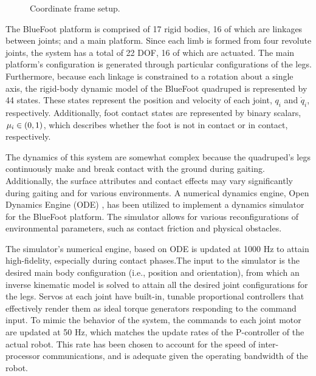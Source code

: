 %
		\begin{figure}[h!]
			\centering
			\caption{Coordinate frame setup.}
			\label{fig::narx_net}
		\end{figure}
%
		The BlueFoot platform is comprised of 17 rigid bodies, 16 of which are linkages between joints; and a main platform. Since each limb is formed from four revolute joints, the system has a total of 22 DOF, 16 of which are actuated. The main platform's configuration is generated through particular configurations of the legs. Furthermore, because each linkage is constrained to a rotation about a single axis, the rigid-body dynamic model of the BlueFoot quadruped is represented by 44 states. These states represent the position and velocity of each joint, $q_{i}$ and $\dot{q}_{i}$, respectively. Additionally, foot contact states are represented by binary scalars, $\mu_{i} \in \left(0,1\right)$, which describes whether the foot is not in contact or in contact, respectively.

		The dynamics of this system are somewhat complex because the quadruped's legs continuously make and break contact with the ground during gaiting. Additionally, the surface attributes and contact effects may vary significantly during gaiting and for various environments. A numerical dynamics engine, Open Dynamics Engine (ODE) \cite{ODE_Website}, has been utilized to implement a dynamics simulator for the BlueFoot platform. The simulator allows for various reconfigurations of environmental parameters, such as contact friction and physical obstacles. 

		The simulator's numerical engine, based on ODE is updated at 1000 Hz to attain high-fidelity, especially during contact phases.The input to the simulator is the desired main body configuration (i.e., position and orientation), from which an inverse kinematic model is solved to attain all the desired joint configurations for the legs. Servos at each joint have built-in, tunable proportional controllers that effectively render them as ideal torque generators responding to the command input. To mimic the behavior of the system, the commands to each joint motor are updated at 50 Hz, which matches the update rates of the P-controller of the actual robot. This rate has been chosen to account for the speed of inter-processor communications, and is adequate given the operating bandwidth of the robot.
		
